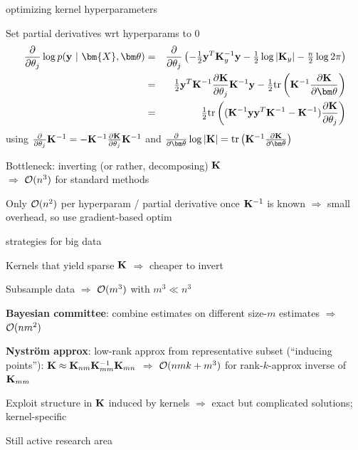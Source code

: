 \documentclass[11pt,compress,t,notes=noshow, xcolor=table]{beamer}
\begin{document}

\begin{framei}[sep=L]{optimizing kernel hyperparameters}
\item Set partial derivatives wrt hyperparams to 0
\begin{eqnarray*}
\pd{}{\theta_j}
\log p(\yv ~|~ \bm{X}, \thetav) &=& \pd{}{\theta_j}  \left(-\tfrac{1}{2}\yv^T\Ky^{-1} \yv - \tfrac{1}{2} \log \left| \Ky \right| - \tfrac{n}{2} \log 2\pi\right) \\ 
&=&\tfrac{1}{2} \yv^T \Kinv \pd{\Kmat}{\theta_j}\Kinv \yv - \tfrac{1}{2} \text{tr}\left(\Kinv \pd{\Kmat}{ \thetav} \right) \\
&=& \tfrac{1}{2} \text{tr}\left((\Kinv\yv\yv^T\Kinv - \Kinv)\pd{\Kmat}{\theta_j}\right)
\end{eqnarray*}
using $\frac{\partial{}}{\partial \theta_j} \mathbf{K}^{-1} = - \mathbf{K}^{-1}  \frac{\partial{\mathbf{K}}}{\partial \theta_j}\mathbf{K}^{-1}$ and $\pd{}{\thetav} \log  |\Kmat| = \text{tr}\left(\Kinv \pd{\Kmat}{\thetav} \right)$
\item Bottleneck: inverting (or rather, decomposing) $\mathbf{K}$ \\$\Rightarrow$ $\mathcal{O}(n^3)$ for standard methods
\item Only $\mathcal{O}(n^2)$ per hyperparam / partial derivative once $\mathbf{K}^{-1}$ is known $\Rightarrow$ small overhead, so use gradient-based optim 
\end{framei}

\begin{framei}[sep=L]{strategies for big data}
\item Kernels that yield sparse $\mathbf{K}$ $\Rightarrow$ cheaper to invert
\item Subsample data $\Rightarrow$ $\mathcal{O}(m^3)$ with $m^3 \ll n^3$
\item \textbf{Bayesian committee}: combine estimates on different size-$m$ estimates $\Rightarrow$ $\mathcal{O}(nm^2)$
\item \textbf{Nyström approx}: low-rank approx from representative subset (``inducing points''): $\mathbf{K} \approx \mathbf{K}_{nm}\mathbf{K}_{mm}^{-1}\mathbf{K}_{mn}$ $\Rightarrow$ $\mathcal{O}(nmk + m^3)$ for rank-$k$-approx inverse of $\mathbf{K}_{mm}$
\item Exploit structure in $\mathbf{K}$ induced by kernels $\Rightarrow$ exact but complicated solutions; kernel-specific
\item Still active research area
\end{framei}

% 
% 
% 
% 
% 
% 

\endlecture
\end{document}

